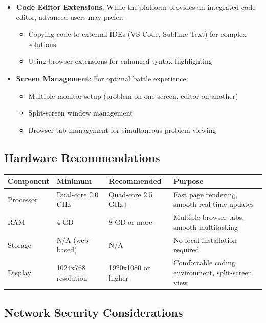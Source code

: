 \documentclass[12pt,a4paper]{article}
\begin{document}
\begin{itemize}[leftmargin=*]
\item \textbf{Code Editor Extensions}: While the platform provides an integrated code editor, advanced users may prefer:
  \begin{itemize}
    \item Copying code to external IDEs (VS Code, Sublime Text) for complex solutions
    \item Using browser extensions for enhanced syntax highlighting
  \end{itemize}
\item \textbf{Screen Management}: For optimal battle experience:
  \begin{itemize}
    \item Multiple monitor setup (problem on one screen, editor on another)
    \item Split-screen window management
    \item Browser tab management for simultaneous problem viewing
  \end{itemize}
\end{itemize}

\subsection{Hardware Recommendations}

\begin{longtable}{|p{3cm}|p{3cm}|p{3cm}|p{4.5cm}|}
\hline
\textbf{Component} & \textbf{Minimum} & \textbf{Recommended} & \textbf{Purpose} \\
\hline
\endhead

Processor & Dual-core 2.0 GHz & Quad-core 2.5 GHz+ & Fast page rendering, smooth real-time updates \\
\hline

RAM & 4 GB & 8 GB or more & Multiple browser tabs, smooth multitasking \\
\hline

Storage & N/A (web-based) & N/A & No local installation required \\
\hline

Display & 1024x768 resolution & 1920x1080 or higher & Comfortable coding environment, split-screen view \\
\hline

\end{longtable}

\subsection{Network Security Considerations}
\end{document}
